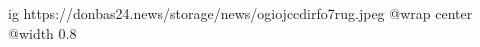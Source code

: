  
 
 
 
 

\ifcmt
  ig https://donbas24.news/storage/news/ogiojccdirfo7rug.jpeg
  @wrap center
  @width 0.8
\fi
